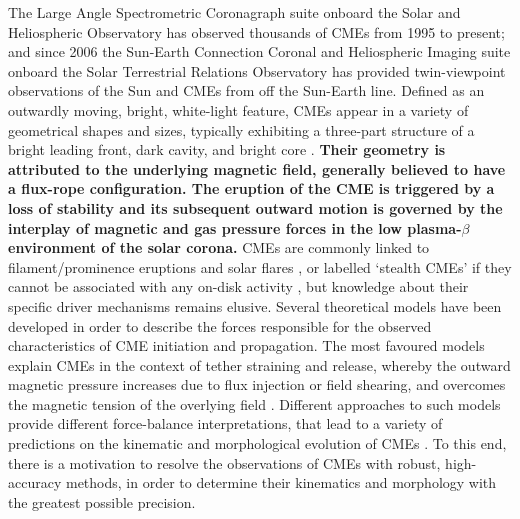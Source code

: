 \documentclass[preprint2]{aastex}
\begin{document}
The Large Angle Spectrometric Coronagraph suite \citep[LASCO;][]{1995SoPh..162..357B} onboard the Solar and Heliospheric Observatory \citep[SOHO;][]{1995SoPh..162....1D} has observed thousands of CMEs from 1995 to present; and since 2006 the Sun-Earth Connection Coronal and Heliospheric Imaging suite \citep[SECCHI;][]{2008SSRv..136...67H} onboard the Solar Terrestrial Relations Observatory \citep[STEREO;][]{2008SSRv..136....5K} has provided twin-viewpoint observations of the Sun and CMEs from off the Sun-Earth line. Defined as an outwardly moving, bright, white-light feature, CMEs appear in a variety of geometrical shapes and sizes, typically exhibiting a three-part structure of a bright leading front, dark cavity, and bright core \citep{1985JGR....90..275I}. {\bf Their geometry is attributed to the underlying magnetic field, generally believed to have a flux-rope configuration. The eruption of the CME is triggered by a loss of stability and its subsequent outward motion is governed by the interplay of magnetic and gas pressure forces in the low plasma-$\beta$ environment of the solar corona.} CMEs are commonly linked to filament/prominence eruptions and solar flares \citep{2002ApJ...581..694M, 2002ApJ...566L.117Z}, or labelled `stealth CMEs' if they cannot be associated with any on-disk activity \citep{2009ApJ...701..283R}, but knowledge about their specific driver mechanisms remains elusive. Several theoretical models have been developed in order to describe the forces responsible for the observed characteristics of CME initiation and propagation. The most favoured models explain CMEs in the context of tether straining and release, whereby the outward magnetic pressure increases  due to flux injection or field shearing, and overcomes the magnetic tension of the overlying field \citep{2001AGUGM.125..143K}. Different approaches to such models provide different force-balance interpretations, that lead to a variety of predictions on the kinematic and morphological evolution of CMEs \citep[e.g.][]{2002A&ARv..10..313P, 2003JGRA..108.1410C, 2006PhRvL..96y5002K, 2008ApJ...683.1192L}. To this end, there is a motivation to resolve the observations of CMEs with robust, high-accuracy methods, in order to determine their kinematics and morphology with the greatest possible precision.
\end{document}
